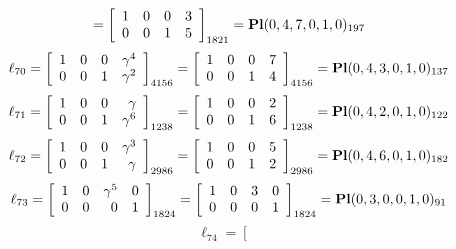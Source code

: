 \documentclass{article}
\begin{document}
{$$=
\left[
\begin{array}{*{4}c}
1  & 0  & 0  & 3\\
0  & 0  & 1  & 5\\
\end{array}
\right]_{1821}
={\rm\bf Pl}(0,4,7,0,1,0 )_{197}$$
$$
\ell_{70} = 
\left[
\begin{array}{*{4}{r}}
1 & 0 & 0 & \gamma^{4}\\
0 & 0 & 1 & \gamma^{2}\\
\end{array}
\right]
_{4156}
=
\left[
\begin{array}{*{4}c}
1  & 0  & 0  & 7\\
0  & 0  & 1  & 4\\
\end{array}
\right]_{4156}
={\rm\bf Pl}(0,4,3,0,1,0 )_{137}$$
$$
\ell_{71} = 
\left[
\begin{array}{*{4}{r}}
1 & 0 & 0 & \gamma \\
0 & 0 & 1 & \gamma^{6}\\
\end{array}
\right]
_{1238}
=
\left[
\begin{array}{*{4}c}
1  & 0  & 0  & 2\\
0  & 0  & 1  & 6\\
\end{array}
\right]_{1238}
={\rm\bf Pl}(0,4,2,0,1,0 )_{122}$$
$$
\ell_{72} = 
\left[
\begin{array}{*{4}{r}}
1 & 0 & 0 & \gamma^{3}\\
0 & 0 & 1 & \gamma \\
\end{array}
\right]
_{2986}
=
\left[
\begin{array}{*{4}c}
1  & 0  & 0  & 5\\
0  & 0  & 1  & 2\\
\end{array}
\right]_{2986}
={\rm\bf Pl}(0,4,6,0,1,0 )_{182}$$
$$
\ell_{73} = 
\left[
\begin{array}{*{4}{r}}
1 & 0 & \gamma^{5} & 0\\
0 & 0 & 0 & 1\\
\end{array}
\right]
_{1824}
=
\left[
\begin{array}{*{4}c}
1  & 0  & 3  & 0\\
0  & 0  & 0  & 1\\
\end{array}
\right]_{1824}
={\rm\bf Pl}(0,3,0,0,1,0 )_{91}$$
$$
\ell_{74} = 
\left[
\begin{array}{*{4}{r}}

\end{array}$$}
\end{document}

